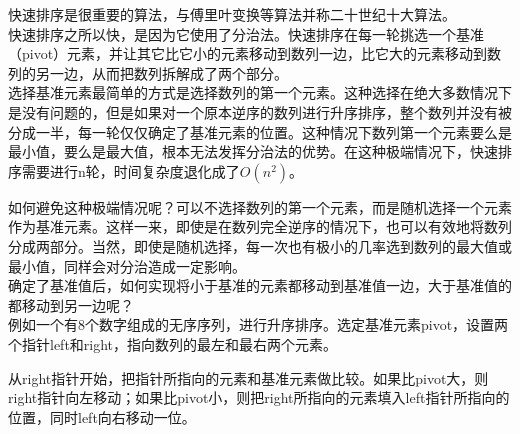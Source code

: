 快速排序是很重要的算法，与傅里叶变换等算法并称二十世纪十大算法。 \\

快速排序之所以快，是因为它使用了分治法。快速排序在每一轮挑选一个基准（pivot）元素，并让其它比它小的元素移动到数列一边，比它大的元素移动到数列的另一边，从而把数列拆解成了两个部分。 \\

选择基准元素最简单的方式是选择数列的第一个元素。这种选择在绝大多数情况下是没有问题的，但是如果对一个原本逆序的数列进行升序排序，整个数列并没有被分成一半，每一轮仅仅确定了基准元素的位置。这种情况下数列第一个元素要么是最小值，要么是最大值，根本无法发挥分治法的优势。在这种极端情况下，快速排序需要进行n轮，时间复杂度退化成了$ O(n^2) $。

如何避免这种极端情况呢？可以不选择数列的第一个元素，而是随机选择一个元素作为基准元素。这样一来，即使是在数列完全逆序的情况下，也可以有效地将数列分成两部分。当然，即使是随机选择，每一次也有极小的几率选到数列的最大值或最小值，同样会对分治造成一定影响。 \\

确定了基准值后，如何实现将小于基准的元素都移动到基准值一边，大于基准值的都移动到另一边呢？ \\

例如一个有8个数字组成的无序序列，进行升序排序。选定基准元素pivot，设置两个指针left和right，指向数列的最左和最右两个元素。

\begin{figure}[H]
    \centering
\end{figure}

从right指针开始，把指针所指向的元素和基准元素做比较。如果比pivot大，则right指针向左移动；如果比pivot小，则把right所指向的元素填入left指针所指向的位置，同时left向右移动一位。

